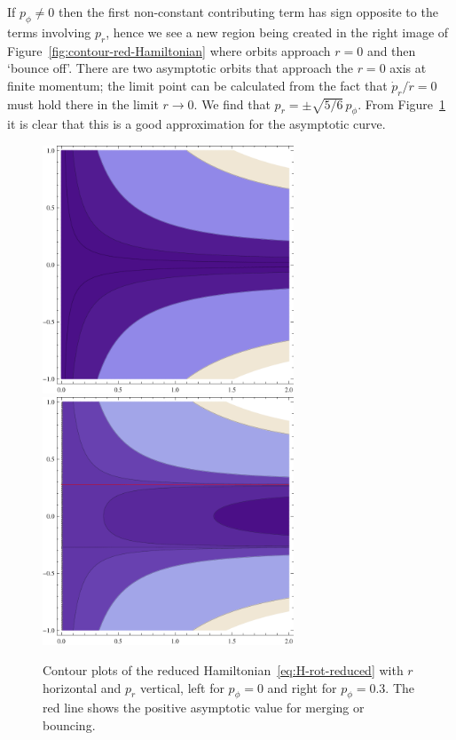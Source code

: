 \documentclass[12pt]{amsart}
\begin{document}
If $p_\phi \neq 0$ then the first non-constant contributing term has
sign opposite to the terms involving $p_r$, hence we see a new region
being created in the right image of Figure~\eqref{fig:contour-red-Hamiltonian} where orbits
approach $r = 0$ and then `bounce off'. There are two asymptotic
orbits that approach the $r = 0$ axis at finite momentum; the limit
point can be calculated from the fact that $\dot{p}_r / \dot{r} = 0$
must hold there in the limit $r \to 0$. We find that
$p_r = \pm \sqrt{5/6}\,p_\phi$. From
Figure~\ref{fig:contour-red-Hamiltonian} it is clear that this is a good
approximation for the asymptotic curve.

\begin{figure}[ht]
  \centering
  \includegraphics[width=7.5cm]{Ham-contour-Jzero}
  \hspace{0.5cm}
  \includegraphics[width=7.5cm]{Ham-contour-Jnonzero}
  \caption{Contour plots of the reduced
    Hamiltonian~\eqref{eq:H-rot-reduced} with $r$ horizontal and $p_r$
    vertical, left for $p_\phi = 0$ and right for
    $p_\phi = 0.3$. The red line shows the positive asymptotic
    value for merging or bouncing.}
  \label{fig:contour-red-Hamiltonian}
\end{figure}
\end{document}
